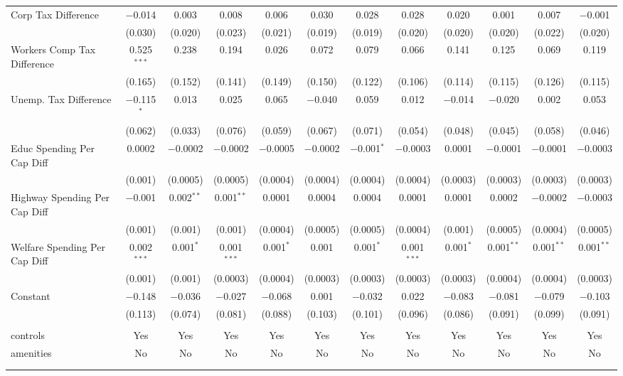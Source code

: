 \begin{table}[!htbp]
\begin{tabular}{@{\extracolsep{5pt}}lccccccccccc}
  Corp Tax Difference & $-$0.014 & 0.003 & 0.008 & 0.006 & 0.030 & 0.028 & 0.028 & 0.020 & 0.001 & 0.007 & $-$0.001 \\ 
  & (0.030) & (0.020) & (0.023) & (0.021) & (0.019) & (0.019) & (0.020) & (0.020) & (0.020) & (0.022) & (0.020) \\ 
  Workers Comp Tax Difference & 0.525$^{***}$ & 0.238 & 0.194 & 0.026 & 0.072 & 0.079 & 0.066 & 0.141 & 0.125 & 0.069 & 0.119 \\ 
  & (0.165) & (0.152) & (0.141) & (0.149) & (0.150) & (0.122) & (0.106) & (0.114) & (0.115) & (0.126) & (0.115) \\ 
  Unemp. Tax Difference & $-$0.115$^{*}$ & 0.013 & 0.025 & 0.065 & $-$0.040 & 0.059 & 0.012 & $-$0.014 & $-$0.020 & 0.002 & 0.053 \\ 
  & (0.062) & (0.033) & (0.076) & (0.059) & (0.067) & (0.071) & (0.054) & (0.048) & (0.045) & (0.058) & (0.046) \\ 
  Educ Spending Per Cap Diff & 0.0002 & $-$0.0002 & $-$0.0002 & $-$0.0005 & $-$0.0002 & $-$0.001$^{*}$ & $-$0.0003 & 0.0001 & $-$0.0001 & $-$0.0001 & $-$0.0003 \\ 
  & (0.001) & (0.0005) & (0.0005) & (0.0004) & (0.0004) & (0.0004) & (0.0004) & (0.0003) & (0.0003) & (0.0003) & (0.0003) \\ 
  Highway Spending Per Cap Diff & $-$0.001 & 0.002$^{**}$ & 0.001$^{**}$ & 0.0001 & 0.0004 & 0.0004 & 0.0001 & 0.0001 & 0.0002 & $-$0.0002 & $-$0.0003 \\ 
  & (0.001) & (0.001) & (0.001) & (0.0004) & (0.0005) & (0.0005) & (0.0004) & (0.001) & (0.0005) & (0.0004) & (0.0005) \\ 
  Welfare Spending Per Cap Diff & 0.002$^{***}$ & 0.001$^{*}$ & 0.001$^{***}$ & 0.001$^{*}$ & 0.001 & 0.001$^{*}$ & 0.001$^{***}$ & 0.001$^{*}$ & 0.001$^{**}$ & 0.001$^{**}$ & 0.001$^{**}$ \\ 
  & (0.001) & (0.001) & (0.0003) & (0.0004) & (0.0003) & (0.0003) & (0.0003) & (0.0003) & (0.0004) & (0.0004) & (0.0003) \\ 
  Constant & $-$0.148 & $-$0.036 & $-$0.027 & $-$0.068 & 0.001 & $-$0.032 & 0.022 & $-$0.083 & $-$0.081 & $-$0.079 & $-$0.103 \\ 
  & (0.113) & (0.074) & (0.081) & (0.088) & (0.103) & (0.101) & (0.096) & (0.086) & (0.091) & (0.099) & (0.091) \\ 
 \hline \\[-1.8ex] 
controls & Yes & Yes & Yes & Yes & Yes & Yes & Yes & Yes & Yes & Yes & Yes \\ 
amenities & No & No & No & No & No & No & No & No & No & No & No \\ 
\hline \\[-1.8ex] 
\hline 
\hline \\[-1.8ex] 
\end{tabular} 
\end{table} 
